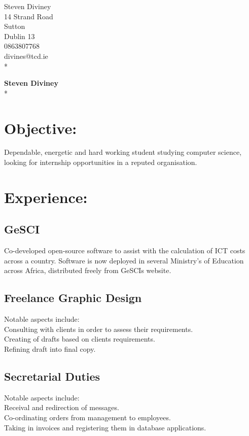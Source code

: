 \documentclass[a4paper,12pt]{article}
\begin{document}
\begin{flushright}
   Steven Diviney \\
   14 Strand Road \\
   Sutton \\
   Dublin 13 \\
   0863807768 \\
   divines@tcd.ie \\* \vspace{10 mm}
\end{flushright}
\begin{flushleft}

{\LARGE\bf Steven Diviney} \\* \vspace{10mm}
\section{Objective:}    Dependable, energetic and hard working student studying computer science, looking for internship opportunities in a reputed organisation.
\section{Experience:}
\subsection{GeSCI} Co-developed open-source software to assist with the calculation of ICT costs across a country. Software is now deployed in several Ministry's of Education across Africa, distributed freely from GeSCIs website. 
\subsection{Freelance Graphic Design} Notable aspects include:\\
Consulting with clients in order to assess their requirements.\\
Creating of drafts based on clients requirements.\\
Refining draft into final copy.\\
\subsection{Secretarial Duties} Notable aspects include: \\
Receival and redirection of messages.\\
Co-ordinating orders from management to employees.\\
Taking in invoices and registering them in database applications.\\

\end{flushleft}
\end{document}
